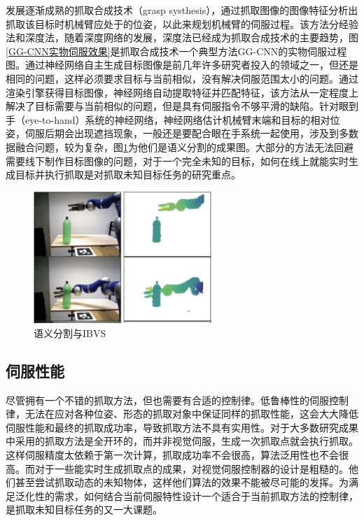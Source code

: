 \documentclass[fontset=fandol,type=bachelor,campus=harbin,bsmainpagenumberline=true]{hithesisbook}
\begin{document}
发展逐渐成熟的抓取合成技术（grasp systhesis），通过抓取图像的图像特征分析出抓取该目标时机械臂应处于的位姿，以此来规划机械臂的伺服过程\cite{varley2015generating}。该方法分经验法和深度法，随着深度网络的发展，深度法已经成为抓取合成技术的主要趋势，图\ref{GG-CNN实物伺服效果}是抓取合成技术一个典型方法GG-CNN的实物伺服过程图。通过神经网络自主生成目标图像是前几年许多研究者投入的领域之一，但还是相同的问题，这样必须要求目标与当前相似，没有解决伺服范围太小的问题。通过渲染引擎获得目标图像，神经网络自动提取特征并匹配特征\cite{adrian2022dfbvs}，该方法从一定程度上解决了目标需要与当前相似的问题，但是具有伺服指令不够平滑的缺陷。针对眼到手（eye-to-hand）系统的神经网络，神经网络估计机械臂末端和目标的相对位姿，伺服后期会出现遮挡现象，一般还是要配合眼在手系统一起使用，涉及到多数据融合问题，较为复杂\cite{rauch2019learning}，图\ref{语义分割IBVS}为他们是语义分割的成果图。大部分的方法无法回避需要线下制作目标图像的问题，对于一个完全未知的目标，如何在线上就能实时生成目标并执行抓取是对抓取未知目标任务的研究重点。
\begin{figure}[h]
\centering
\includegraphics[width = 0.6\textwidth]{chapter1/语义分割IBVS}
\caption{语义分割与IBVS}
\label{语义分割IBVS}
\end{figure}
\subsection{伺服性能}
尽管拥有一个不错的抓取方法，但也需要有合适的控制律。低鲁棒性的伺服控制律，无法在应对各种位姿、形态的抓取对象中保证同样的抓取性能，这会大大降低伺服性能和最终的抓取成功率，导致抓取方法不具有实用性。对于大多数研究成果中采用的抓取方法是全开环的，而并非视觉伺服，生成一次抓取点就会执行抓取\cite{lenz2015deep,pinto2016supersizing,johns2016deep}。这样伺服精度太依赖于第一次计算，抓取成功率不会很高，算法泛用性也不会很高。而对于一些能实时生成抓取点的成果，对视觉伺服控制器的设计是粗糙的\cite{haviland2020control,viereck2017learning}。他们甚至尝试抓取动态的未知物体，这样他们算法的效果不能被尽可能的发挥。为满足泛化性的需求，如何结合当前伺服特性设计一个适合于当前抓取方法的控制律，是抓取未知目标任务的又一大课题。
\end{document}
